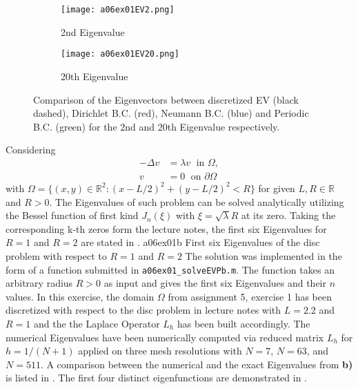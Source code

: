 \begin{figure}[H]
\vspace*{\FigUpperVSpace}
\def\MeshFigWidth{210pt}
	\begin{subfigure}[b]{0.5\hsize}
		\centering
		\texttt{[image: a06ex01EV2.png]} 
		\caption{2nd Eigenvalue}
		\label{fig:a06ex01EV2}
	\end{subfigure}
	\begin{subfigure}[b]{0.5\hsize}
		\centering
		\texttt{[image: a06ex01EV20.png]} 
		\caption{20th Eigenvalue}
		\label{fig:a06ex01EV20}
	\end{subfigure}
	\caption{Comparison of the Eigenvectors between discretized EV (black dashed), Dirichlet B.C. (red), Neumann B.C. (blue) and Periodic B.C. (green) for the 2nd and 20th Eigenvalue respectively.}
	\label{fig:a06ex01a}
\end{figure}
%
Considering
\begin{align}
	-\Delta v &= \lambda v \;\text{ in } \Omega, \\
			v &= 0 		   \;\text{ on } \partial\Omega
\end{align}
with $\Omega = \{(x,y) \in \mathbb{R}^2 \colon \left(x-L/2\right)^2 + \left(y-L/2\right)^2 < R\}$ for given $L, R \in \mathbb{R}$ and $R>0$.
The Eigenvalues of such problem can be solved analytically utilizing the Bessel function of first kind $J_n(\xi)$ with $\xi = \sqrt{\lambda} R$ at its zero.
Taking the corresponding k-th zeros form the lecture notes, the first six Eigenvalues for $R=1$ and $R=2$  are stated in .
%
\vspace*{2\FigUpperVSpace}
		 {a06ex01b}
		 {First six Eigenvalues of the disc problem with respect to $R=1$ and $R=2$}
%
The solution was implemented in the form of a function submitted in \texttt{a06ex01\_solveEVPb.m}.
The function takes an arbitrary radius $R>0$ as input and gives the first six Eigenvalues and their $n$ values. 
%
In this exercise, the domain $\Omega$ from assignment 5, exercise 1 has been discretized with respect to the disc problem in lecture notes with $L=2.2$ and $R=1$ and the the Laplace Operator $L_h$ has been built accordingly.
The numerical Eigenvalues have been numerically computed via reduced matrix $L_h$ for $h=1/(N+1)$ applied on three mesh resolutions with $N=7$, $N=63$, and $N=511$.
A comparison between the numerical and the exact Eigenvalues from \textbf{b)} is listed in .
The first four distinct eigenfunctions are demonstrated in .
